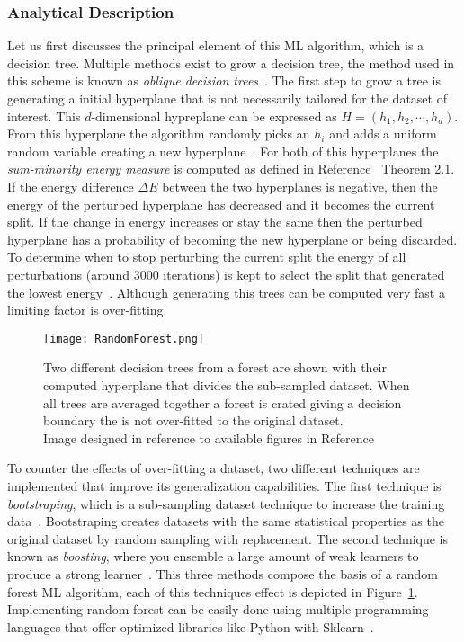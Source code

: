    
\subsubsection{Analytical Description}

 Let us first discusses the principal element of this ML algorithm, which is a decision tree. Multiple methods exist to grow a decision tree, the method used in this scheme is known as  \textit{oblique decision trees}~\cite{ho1995random}.  The first step to grow a tree is generating a initial hyperplane that is not necessarily tailored for the dataset of interest. This $d$-dimensional hypreplane can be expressed as $H=(h_{1},h_{2},\cdots,h_{d})$. From this hyperplane the algorithm randomly picks an $h_{i}$ and adds a uniform random variable creating a new hyperplane~\cite{heath1993induction}. For both of this hyperplanes the \textit{sum-minority energy measure} is computed as defined in Reference~\cite{heath1993induction} Theorem 2.1. If the energy difference $\Delta E$ between the two hyperplanes is negative, then the energy of the perturbed hyperplane has decreased and it becomes the current split. If the change in energy increases or stay the same then the perturbed hyperplane has a probability of becoming the new hyperplane or being discarded. To determine when to stop perturbing the current split the energy of all perturbations (around 3000 iterations) is kept to select the split that generated the lowest energy~\cite{heath1993induction}. Although generating this trees can be computed very fast a limiting factor is over-fitting.~\\

\begin{figure}[h]
\centering
\texttt{[image: RandomForest.png]}
\caption{ Two different decision trees from a forest are shown  with their computed hyperplane that divides the sub-sampled dataset. When all trees are averaged together a forest is crated giving a decision boundary the is not over-fitted to the original dataset.\\ {\scriptsize Image designed in reference to available figures in Reference~\cite{RFimg}} }
\label{fig:RFshow}
\end{figure}

To counter the effects of over-fitting a dataset, two different techniques are implemented that improve its generalization capabilities. The first technique is \textit{ bootstraping}, which is a sub-sampling dataset technique to increase the training data~\cite{friedman2002stochastic}. Bootstraping creates datasets with the same statistical properties as the original dataset by random sampling with replacement. The second technique is known as \textit{boosting}, where you ensemble a large amount of weak learners to produce a strong learner~\cite{hancock2012bootstrapping}. This three methods compose the basis of a random forest ML algorithm, each of this techniques effect is depicted in Figure~\ref{fig:RFshow}. Implementing random forest can be easily done using multiple programming languages that offer optimized libraries like Python with Sklearn~\cite{scikit-learn}.

